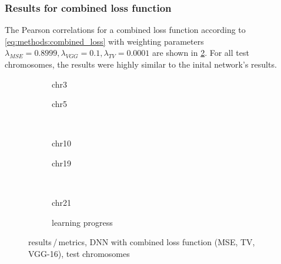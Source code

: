 \subsubsection{Results for combined loss function} \label{sec:results:loss_functions}
The Pearson correlations for a combined loss function according to \cref{eq:methods:combined_loss} with weighting parameters $\lambda_\mathit{MSE} = 0.8999, \lambda_\mathit{VGG}=0.1, \lambda_\mathit{TV}=0.0001$ are shown in \cref{fig:results:combilossDNN_pearson}.
For all test chromosomes, the results were highly similar to the inital network's results.
\begin{figure}[p]
    \begin{subfigure}{0.45\textwidth}
        \scriptsize
        \caption{chr3}
    \end{subfigure} \hfill
    \begin{subfigure}{0.45\textwidth}
        \scriptsize
        \caption{chr5}
    \end{subfigure}\\[5mm]
    \begin{subfigure}{0.45\textwidth}
        \scriptsize
        \caption{chr10}
    \end{subfigure}\hfill
    \begin{subfigure}{0.45\textwidth}
        \scriptsize
        \caption{chr19}
    \end{subfigure}\\[3mm]
    \centering
    \begin{subfigure}{0.45\textwidth}
        \scriptsize
        \caption{chr21}
    \end{subfigure}\hfill
    \begin{subfigure}{0.45\textwidth}
        \caption{learning progress} \label{fig:results:combilossDNN_lossEpochs}
    \end{subfigure}
    \caption{results\,/\,metrics, DNN with combined loss function (MSE, TV, VGG-16),  test chromosomes}
    \label{fig:results:combilossDNN_pearson}
\end{figure}

